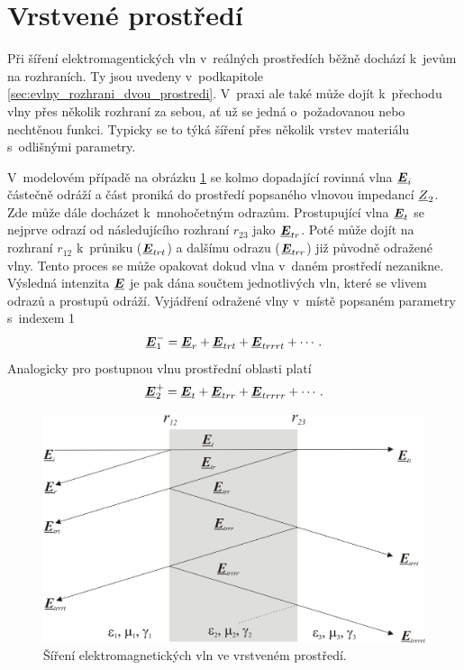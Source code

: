 \section{Vrstvené prostředí}
Při šíření elektromagentických vln v~reálných prostředích běžně dochází k~jevům na rozhraních. Ty jsou uvedeny v~podkapitole \ref{sec:evlny_rozhrani_dvou_prostredi}. V~praxi ale také může dojít k~přechodu vlny přes několik rozhraní za sebou, ať už se jedná o~požadovanou nebo nechtěnou funkci. Typicky se to týká šíření přes několik vrstev materiálu s~odlišnými parametry.

V~modelovém případě na obrázku \ref{obr:evlny_vrstvene_rada} se kolmo dopadající rovinná vlna $\mbox{\underline{\boldmath$E$}}_{i}$ částečně odráží a část proniká do prostředí popsaného vlnovou impedancí ${\underline{Z}}_{2}$. Zde může dále docházet k~mnohočetným odrazům. Prostupující vlna $\mbox{\underline{\boldmath$E$}}_{t}$ se nejprve odrazí od následujícího rozhraní $r_{23}$ jako $\mbox{\underline{\boldmath$E$}}_{tr}$. Poté může dojít na rozhraní $r_{12}$  k~průniku ($\mbox{\underline{\boldmath$E$}}_{trt}$) a dalšímu odrazu ($\mbox{\underline{\boldmath$E$}}_{trr}$) již původně odražené vlny. Tento proces se může opakovat dokud vlna v~daném prostředí nezanikne. Výsledná intenzita $\mbox{\underline{\boldmath$E$}}$ je pak dána součtem jednotlivých vln, které se vlivem odrazů a prostupů odráží. Vyjádření odražené vlny v~místě popsaném parametry s~indexem 1
\begin{equation}
	\mbox{\underline{\boldmath$E$}}_{1}^{-} = \mbox{\underline{\boldmath$E$}}_{r} + \mbox{\underline{\boldmath$E$}}_{trt} + \mbox{\underline{\boldmath$E$}}_{trrrt} + \cdots.
	\label{rce:evlny_vrstvene_rada1}
\end{equation}
Analogicky pro postupnou vlnu prostřední oblasti platí
\begin{equation}
	\mbox{\underline{\boldmath$E$}}_{2}^{+} = \mbox{\underline{\boldmath$E$}}_{t} + \mbox{\underline{\boldmath$E$}}_{trr} + \mbox{\underline{\boldmath$E$}}_{trrrr} + \cdots.
	\label{rce:evlny_vrstvene_rada2}
\end{equation}
\begin{figure}[!h]
	\centering
	\includegraphics[width=12cm]{evlny_vrstvene_rada.png}
	\caption{Šíření elektromagnetických vln ve vrstveném prostředí. \cite{emp}}
	\label{obr:evlny_vrstvene_rada}
\end{figure}

